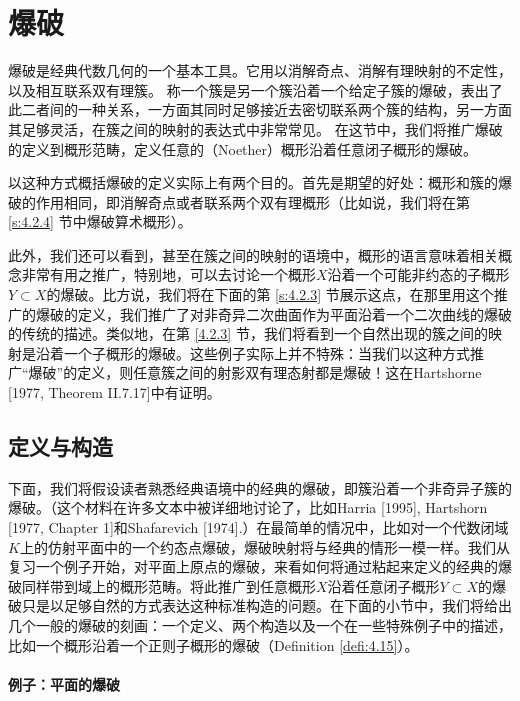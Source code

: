 \section{爆破}\label{s:4.2}

爆破是经典代数几何的一个基本工具。它用以消解奇点、消解有理映射的不定性，以及相互联系双有理簇。
称一个簇是另一个簇沿着一个给定子簇的爆破，表出了此二者间的一种关系，一方面其同时足够接近去密切联系两个簇的结构，另一方面其足够灵活，在簇之间的映射的表达式中非常常见。
在这节中，我们将推广爆破的定义到概形范畴，定义任意的（Noether）概形沿着任意闭子概形的爆破。

以这种方式概括爆破的定义实际上有两个目的。首先是期望的好处：概形和簇的爆破的作用相同，即消解奇点或者联系两个双有理概形（比如说，我们将在第 \ref{s:4.2.4} 节中爆破算术概形）。

此外，我们还可以看到，甚至在簇之间的映射的语境中，概形的语言意味着相关概念非常有用之推广，特别地，可以去讨论一个概形$X$沿着一个可能非约态的子概形$Y\subset X$的爆破。比方说，我们将在下面的第 \ref{s:4.2.3} 节展示这点，在那里用这个推广的爆破的定义，我们推广了对非奇异二次曲面作为平面沿着一个二次曲线的爆破的传统的描述。类似地，在第 \ref{4.2.3} 节，我们将看到一个自然出现的簇之间的映射是沿着一个子概形的爆破。这些例子实际上并不特殊：当我们以这种方式推广“爆破”的定义，则任意簇之间的射影双有理态射都是爆破！这在Hartshorne [1977, Theorem II.7.17]中有证明。

\subsection{定义与构造}\label{s:4.2.1}


下面，我们将假设读者熟悉经典语境中的经典的爆破，即簇沿着一个非奇异子簇的爆破。（这个材料在许多文本中被详细地讨论了，比如Harria [1995], Hartshorn [1977, Chapter 1]和Shafarevich [1974].）在最简单的情况中，比如对一个代数闭域$K$上的仿射平面中的一个约态点爆破，爆破映射将与经典的情形一模一样。我们从复习一个例子开始，对平面上原点的爆破，来看如何将通过粘起来定义的经典的爆破同样带到域上的概形范畴。将此推广到任意概形$X$沿着任意闭子概形$Y\subset X$的爆破只是以足够自然的方式表达这种标准构造的问题。在下面的小节中，我们将给出几个一般的爆破的刻画：一个定义、两个构造以及一个在一些特殊例子中的描述，比如一个概形沿着一个正则子概形的爆破（Definition \ref{defi:4.15}）。

\paragraph*{例子：平面的爆破}

